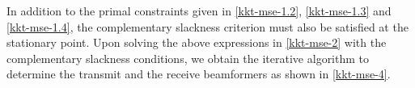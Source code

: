 In addition to the primal constraints given in \eqref{kkt-mse-1.2}, \eqref{kkt-mse-1.3} and \eqref{kkt-mse-1.4}, the complementary slackness criterion must also be satisfied at the stationary point. Upon solving the above expressions in \eqref{kkt-mse-2} with the complementary slackness conditions, we obtain the iterative algorithm to determine the transmit and the receive beamformers as shown in \eqref{kkt-mse-4}.
